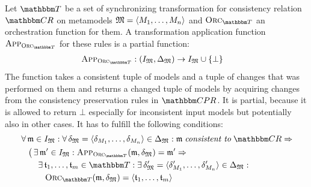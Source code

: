 \begin{definition}
    Let $\transformationset{T}$ be a set of synchronizing transformation for consistency relation $\consistencyrelationset{CR}$ on metamodels $\mathfrak{M} = \langle M_{1}, \dots, M_{n} \rangle$ and $\orcfunction{\transformationset{T}}$ an orchestration function for them.
    A transformation \gls{application function} $\appfunction{\orcfunction{\transformationset{T}}}$ for these rules is a partial function:
    \begin{align*}
        &
        \appfunction{\orcfunction{\transformationset{T}}} : (\metamodeltupleinstanceset{M}, \changeuniverse{\metamodeltuple{M}}) \rightarrow \metamodeltupleinstanceset{M} \cup \setted{\bot}
    \end{align*}
    The function takes a consistent tuple of models and a tuple of changes that was performed on them and returns a changed tuple of models by acquiring changes from the consistency preservation rules in $\consistencypreservationruleset{}$. It is partial, because it is allowed to return $\bot$ especially for inconsistent input models but potentially also in other cases. It has to fulfill the following conditions:
    \begin{align*}
        &
        \forall \modeltuple{m} \in \metamodeltupleinstanceset{M} : \forall \changetuple{\metamodeltuple{M}} = \tupled{\change{\metamodel{M}{1}}, \dots, \change{\metamodel{M}{n}}} \in \changeuniverse{\metamodeltuple{M}} :
        \modeltuple{m} \consistenttomath \consistencyrelationset{CR} \Rightarrow \\
        & \formulaskip
        \big( 
            \exists \modeltuple{m'} \in \metamodeltupleinstanceset{M} : 
            \appfunction{\orcfunction{\transformationset{T}}}(\modeltuple{m}, \changetuple{\metamodeltuple{M}}) = \modeltuple{m'} \Rightarrow\\
            & \formulaskip \formulaskip
            \exists \transformation{t}_{1}, \dots, \transformation{t}_{m} \in \transformationset{T} :
            \exists \changetuple{\metamodeltuple{M}}' = \tupled{\change{\metamodel{M}{1}}', \dots, \change{\metamodel{M}{n}}'} \in \changeuniverse{\metamodeltuple{M}} :\\
            & \formulaskip \formulaskip \formulaskip
            \orcfunction{\transformationset{T}}(\modeltuple{m}, \changetuple{\metamodeltuple{M}}) = \tupled{\transformation{t}_{1}, \dots, \transformation{t}_{m}} \\

\end{align*}
\end{definition}
